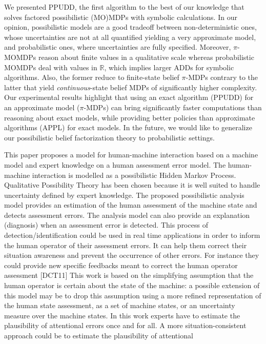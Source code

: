 We
presented PPUDD, the first algorithm to the best of our knowledge that 
solves factored possibilistic (MO)MDPs with symbolic calculations. In our opinion,
possibilistic models are a good tradeoff between non-deterministic ones, whose
uncertainties are not at all quantified yielding a very approximate model, and
probabilistic ones, where uncertainties are fully specified. Moreover,
$\pi$-MOMDPs reason about finite values in a qualitative scale whereas
probabilistic MOMDPs deal with values in $\mathbb{R}$, which implies larger ADDs
for symbolic algorithms. Also, the former reduce to finite-state belief
$\pi$-MDPs contrary to the latter that yield \emph{continuous}-state belief MDPs
of significantly higher complexity. Our experimental results highlight that using an
exact algorithm (PPUDD) for an approximate model ($\pi$-MDPs) can bring significantly faster computations
than reasoning about exact models, while providing better
policies than approximate algorithms (APPL) for exact models. In the future, we
would like to generalize our possibilistic belief factorization theory to
probabilistic settings. %

This paper proposes a model for human-machine interaction
based on a machine model and expert knowledge on a human
assessment error model. The human-machine interaction is
modelled as a possibilistic Hidden Markov Process. Qualitative
Possibility Theory has been chosen because it is well suited to
handle uncertainty defined by expert knowledge. The proposed
possibilistic analysis model provides an estimation of the
human assessment of the machine state and detects assessment
errors. The analysis model can also provide an explanation
(diagnosis) when an assessment error is detected.
This process of detection/identification could be used in real
time applications in order to inform the human operator of
their assessment errors. It can help them correct their situation
awareness and prevent the occurrence of other errors. For
instance they could provide new specific feedbacks meant to
correct the human operator assessment [DCT11]
This work is based on the simplifying assumption that the
human operator is certain about the state of the machine:
a possible extension of this model may be to drop this
assumption using a more refined representation of the human
state assessment, as a set of machine states, or an uncertainty
measure over the machine states.
In this work experts have to estimate the plausibility of
attentional errors once and for all. A more situation-consistent
approach could be to estimate the plausibility of attentional

